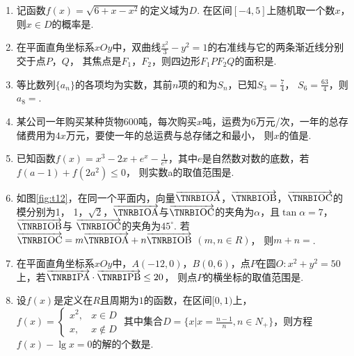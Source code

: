 \documentclass[12pt,space]{ctexart} %
\begin{document}
\begin{enumerate}[itemsep=-0.3em,topsep=0pt]
  \item 记函数$\displaystyle{f(x)=\sqrt{6+x-x^2}}$的定义域为$D$. 在区间$[-4,5]$上随机取一个数$x$，
        则$x\in D$的概率是.
  \item 在平面直角坐标系$xOy$中，双曲线$\displaystyle{\frac{x^2}{3}-y^2=1}$的右准线与它的两条渐近线分别交于点$P$，$Q$，
        其焦点是$F_1$，$F_2$，则四边形$F_1PF_2Q$的面积是.
  \item 等比数列$\{a_n\}$的各项均为实数，其前$n$项的和为$S_n$，已知$\displaystyle{S_3=\frac{7}{4}}$，
        $\displaystyle{S_6=\frac{63}{4}}$，则$a_8=$.
  \item 某公司一年购买某种货物$600$吨，每次购买$x$吨，运费为$6$万元/次，一年的总存储费用为$4x$万元，要使一年的总运费与总存储之和最小，
        则$x$的值是.
  \item 已知函数$\displaystyle{f(x)=x^3-2x+e^x-\frac{1}{e^x}}$，其中$e$是自然数对数的底数，若$f(a-1)+f(2a^2)\leq 0$，
        则实数a的取值范围是\blank{$[-1, \frac{1}{2}]$}.
  \item 如图\ref{fig:t12}，在同一个平面内，向量$\overrightarrow{\bfit{OA}}$，$\overrightarrow{\bfit{OB}}$，$\overrightarrow{\bfit{OC}}$的模分别为1，
        1，$\sqrt{2}$，$\overrightarrow{\bfit{OA}}$与$\overrightarrow{\bfit{OC}}$的夹角为$\alpha$，且$\tan\alpha=7$，$\overrightarrow{\bfit{OB}}$与
        $\overrightarrow{\bfit{OC}}$的夹角为$45^\circ$. 若$\overrightarrow{\bfit{OC}}=m\overrightarrow{\bfit{OA}}+n\overrightarrow{\bfit{OB}}$ $(m, n \in R)$，
        则$m+n=$.
  \item 在平面直角坐标系$xOy$中，$A(-12,0)$，$B(0,6)$，点$P$在圆$O: x^2+y^2=50$上，若$\overrightarrow{\bfit{PA}}\cdot\overrightarrow{\bfit{PB}}\leq 20$，
        则点$P$的横坐标的取值范围是\blank{$[-5\sqrt{2}, 1]$}.
  \item 设$f(x)$是定义在$R$且周期为$1$的函数，在区间$[0,1)$上，$\displaystyle{f(x)=\begin{cases}x^2,&x\in D\\x,&x\notin D\end{cases}}$
        其中集合$\displaystyle{D=\{x|x=\frac{n-1}{n}, n\in N_+\}}$，则方程$f(x)-\lg x=0$的解的个数是.
\end{enumerate}
\end{document}
